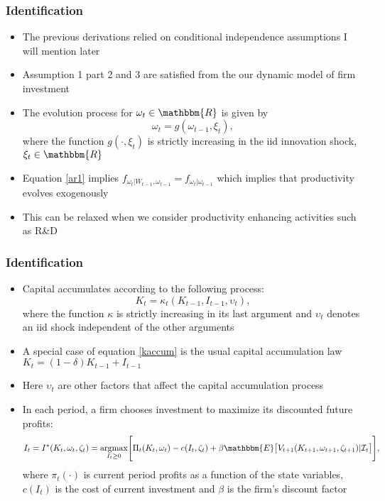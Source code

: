 \documentclass{beamer}
\begin{document}
\begin{frame}
\frametitle{Identification}
\begin{itemize}
\item The previous derivations relied on conditional independence assumptions I will mention later
\item Assumption 1 part 2 and 3 are satisfied from the our dynamic model of firm investment
\item The evolution process for $\omega_{t}\in \mathbbm{R}$ is given by
\begin{equation} \label{ar1}
\omega_{t}=g(\omega_{t-1}, \xi_{t}),
\end{equation}
where the function $g(\cdot, \xi_{t})$ is strictly increasing in the iid innovation shock, $\xi_{t}\in \mathbbm{R}$
\item Equation \eqref{ar1} implies $f_{\omega_{t}|W_{t-1}, \omega_{t-1}}=f_{\omega_{t}|\omega_{t-1}}$ which implies that productivity evolves exogenously
\item This can be relaxed when we consider productivity enhancing activities such as R\&D
\end{itemize}
\end{frame}

\begin{frame}
\frametitle{Identification}
\begin{itemize}
\item Capital accumulates according to the following process:
\begin{equation} \label{kaccum}
K_{t}=\kappa_{t}(K_{t-1}, I_{t-1}, \upsilon_{t}),
\end{equation}
where the function $\kappa$ is strictly increasing in its last argument and $\upsilon_{t}$ denotes an iid shock independent of the other arguments
\item A special case of equation \eqref{kaccum} is the usual capital accumulation law $K_{t}=(1-\delta)K_{t-1}+I_{t-1}$
\item Here $\upsilon_{t}$ are other factors that affect the capital accumulation process
\item In each period, a firm chooses investment to maximize its discounted future profits:
\footnotesize
\begin{equation} \label{valuefn}
I_{t}=I^{*}(K_{t}, \omega_{t}, \zeta_{t})=\underset{I_{t}\geq 0}{\operatorname{argmax}}\Bigg[\Pi_{t}(K_{t}, \omega_{t})-c(I_{t}, \zeta_{t})+\beta\mathbbm{E}\big[V_{t+1}(K_{t+1}, \omega_{t+1}, \zeta_{t+1})|\mathcal{I}_{t}\big]\Bigg],
\end{equation}
\normalsize
where $\pi_{t}(\cdot)$ is current period profits as a function of the state variables, $c(I_{t})$ is the cost of current investment and $\beta$ is the firm's discount factor
\end{itemize}
\end{frame}
\end{document}
